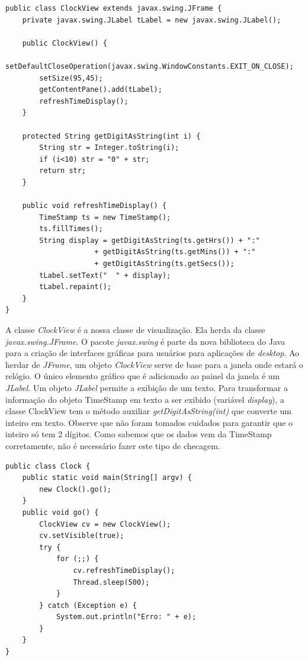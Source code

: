 \documentclass[
	11pt,				%
	openright,
	twoside,			%
	a4paper,			%
	english,			%
	french,
	brazil,				%
	sumario=tradicional
	]{abntex2}
\begin{document}
\begin{verbatim}
public class ClockView extends javax.swing.JFrame {
    private javax.swing.JLabel tLabel = new javax.swing.JLabel();
    
    public ClockView() {
        setDefaultCloseOperation(javax.swing.WindowConstants.EXIT_ON_CLOSE);
        setSize(95,45);
        getContentPane().add(tLabel);
        refreshTimeDisplay();
    }
    
    protected String getDigitAsString(int i) {
        String str = Integer.toString(i);
        if (i<10) str = "0" + str;
        return str;
    }
    
    public void refreshTimeDisplay() {
        TimeStamp ts = new TimeStamp();
        ts.fillTimes();
        String display = getDigitAsString(ts.getHrs()) + ":"
                     + getDigitAsString(ts.getMins()) + ":"
                     + getDigitAsString(ts.getSecs());
        tLabel.setText("  " + display);
        tLabel.repaint();
    }
}
\end{verbatim}

A classe \emph{ClockView} é a nossa classe de visualização. Ela herda da classe \emph{javax.swing.JFrame}. O pacote \emph{javax.swing} é parte da nova biblioteca do Java para a criação de interfaces gráficas para usuários para aplicações de \textit{desktop}. Ao herdar de \emph{JFrame}, um objeto \emph{ClockView} serve de base para a janela onde estará o relógio. O único elemento gráfico que é adicionado ao painel da janela é um \emph{JLabel}. Um objeto \emph{JLabel} permite a exibição de um texto. Para transformar a informação do objeto TimeStamp em texto a ser exibido (variável \emph{display}), a classe ClockView tem o método auxiliar \emph{getDigitAsString(int)} que converte um inteiro em texto. Observe que não foram tomados cuidados para garantir que o inteiro só tem 2 dígitos. Como sabemos que os dados vem da TimeStamp corretamente, não é necessário fazer este tipo de checagem.

\begin{verbatim}
public class Clock {
    public static void main(String[] argv) {
        new Clock().go();
    }
    public void go() {
        ClockView cv = new ClockView();
        cv.setVisible(true);
        try {
            for (;;) {
                cv.refreshTimeDisplay();
                Thread.sleep(500);
            }
        } catch (Exception e) {
            System.out.println("Erro: " + e);
        }
    }
}
\end{verbatim}
\end{document}
